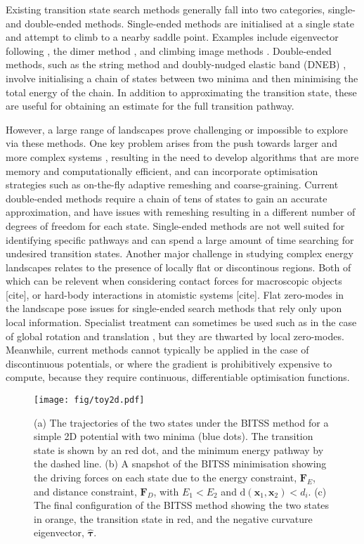 \documentclass[aps,prl,twocolumn,10pt,groupedaddress]{revtex4-2}
\begin{document}
Existing transition state search methods generally fall into two categories, single- and double-ended methods.
Single-ended methods are initialised at a single state and attempt to climb to a nearby saddle point.
Examples include eigenvector following \cite{Cerjan1981}, the dimer method \cite{Heyden2005,Kastner2008}, and climbing image methods \cite{E2007,Ren2013}.
Double-ended methods, such as the string method \cite{E2002,E2007} and doubly-nudged elastic band (DNEB) \cite{Trygubenko2004}, involve initialising a chain of states between two minima and then minimising the total energy of the chain.
In addition to approximating the transition state, these are useful for obtaining an estimate for the full transition pathway.

However, a large range of landscapes prove challenging or impossible to explore via these methods.
One key problem arises from the push towards larger and more complex systems \cite{Trefethen2013,Shalf2020,Alexander2020}, resulting in the need to develop algorithms that are more memory and computationally efficient, and can incorporate optimisation strategies such as on-the-fly adaptive remeshing and coarse-graining.
Current double-ended methods require a chain of tens of states to gain an accurate approximation, and have issues with remeshing resulting in a different number of degrees of freedom for each state.
Single-ended methods are not well suited for identifying specific pathways and can spend a large amount of time searching for undesired transition states.
Another major challenge in studying complex energy landscapes relates to the presence of locally flat or discontinous regions.
Both of which can be relevent when considering contact forces for macroscopic objects [cite], or hard-body interactions in atomistic systems [cite].
Flat zero-modes in the landscape pose issues for single-ended search methods that rely only upon local information.
Specialist treatment can sometimes be used such as in the case of global rotation and translation \cite{Page1988}, but they are thwarted by local zero-modes.
Meanwhile, current methods cannot typically be applied in the case of discontinuous potentials, or where the gradient is prohibitively expensive to compute, because they require continuous, differentiable optimisation functions.

\begin{figure}[htb]
  \texttt{[image: fig/toy2d.pdf]}
  \caption{\label{fig:toy2d}
    (a) The trajectories of the two states under the BITSS method for a simple 2D potential with two minima (blue dots).
        The transition state is shown by an red dot, and the minimum energy pathway by the dashed line.
    (b) A snapshot of the BITSS minimisation showing the driving forces on each state due to the energy constraint, $\bm{F}_E$, and distance constraint, $\bm{F}_D$, with $E_1 < E_2$ and $\mathrm{d}(\bm{x}_1,\bm{x}_2) < d_i$.
    (c) The final configuration of the BITSS method showing the two states in orange, the transition state in red, and the negative curvature eigenvector, $\bm{\hat{\tau}}$.
  }
\end{figure}
\end{document}
